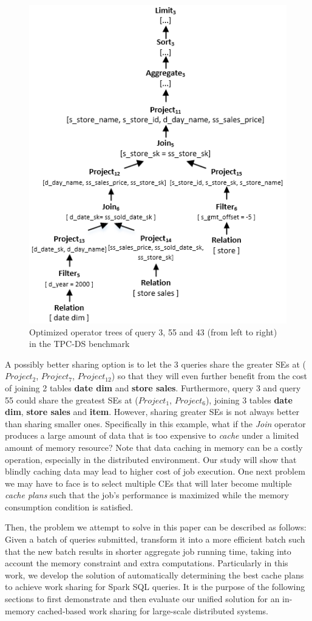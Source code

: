 \begin{figure}[htbp]
   \includegraphics[scale=0.5]{figures/q43}
   \caption{Optimized operator trees of query 3, 55 and 43 (from left to right) in the TPC-DS benchmark} 
   \label{fig:queries}
\end{figure}

A possibly better sharing option is to let the 3 queries share the greater SEs at ($Project_2$, $Project_7$, $Project_{12}$) so that they will even further benefit from the cost of joining 2 tables \textbf{date dim} and \textbf{store sales}. Furthermore, query 3 and query 55 could share the greatest SEs at ($Project_1$, $Project_6$), joining 3 tables \textbf{date dim}, \textbf{store sales} and \textbf{item}. However, sharing greater SEs is not always better than sharing smaller ones. Specifically in this example, what if the \emph{Join} operator produces a large amount of data that is too expensive to \emph{cache} under a limited amount of memory resource? Note that data caching in memory can be a costly operation, especially in the distributed environment. Our study will show that blindly caching data may lead to higher cost of job execution. One next problem we may have to face is to select multiple CEs that will later become multiple \emph{cache plans} such that the job's performance is maximized while the memory consumption condition is satisfied.

Then, the problem we attempt to solve in this paper can be described as follows: Given a batch of queries submitted, transform it into a more efficient batch such that the new batch results in shorter aggregate job running time, taking into account the memory constraint and extra computations. Particularly in this work, we develop the solution of automatically determining the best cache plans to achieve work sharing for Spark SQL queries. It is the purpose of the following sections to first demonstrate and then evaluate our unified solution for an in-memory cached-based work sharing for large-scale distributed systems.